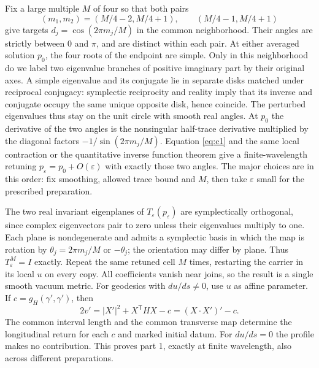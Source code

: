 \documentclass[11pt]{article}
\begin{document}
Fix a large multiple \(M\) of four so that both pairs
\begin{equation}\label{eq:targets}
 (m_1,m_2)=(M/4-2,M/4+1),\qquad (M/4-1,M/4+1)
\end{equation}
give targets \(d_j=\cos(2\pi m_j/M)\) in the common neighborhood. Their angles are strictly between \(0\) and \(\pi\), and are distinct within each pair. At either averaged solution \(p_0\), the four roots of the endpoint are simple. Only in this neighborhood do we label two eigenvalue branches of positive imaginary part by their original axes. A simple eigenvalue and its conjugate lie in separate disks matched under reciprocal conjugacy: symplectic reciprocity and reality imply that its inverse and conjugate occupy the same unique opposite disk, hence coincide. The perturbed eigenvalues thus stay on the unit circle with smooth real angles. At \(p_0\) the derivative of the two angles is the nonsingular half-trace derivative multiplied by the diagonal factors \(-1/\sin(2\pi m_j/M)\). Equation \eqref{eq:c1} and the same local contraction or the quantitative inverse function theorem give a finite-wavelength retuning \(p_\varepsilon=p_0+O(\varepsilon)\) with exactly those two angles. The major choices are in this order: fix smoothing, allowed trace bound and \(M\), then take \(\varepsilon\) small for the prescribed preparation.

The two real invariant eigenplanes of \(T_\varepsilon(p_\varepsilon)\) are symplectically orthogonal, since complex eigenvectors pair to zero unless their eigenvalues multiply to one. Each plane is nondegenerate and admits a symplectic basis in which the map is rotation by \(\theta_j=2\pi m_j/M\) or \(-\theta_j\); the orientation may differ by plane. Thus \(T_\varepsilon^M=I\) exactly. Repeat the same retuned cell \(M\) times, restarting the carrier in its local \(u\) on every copy. All coefficients vanish near joins, so the result is a single smooth vacuum metric. For geodesics with \(du/ds\ne0\), use \(u\) as affine parameter. If \(c=g_H(\gamma',\gamma')\), then
\[
 2v'=|X'|^2+X^\mathsf T H X-c=(X\cdot X')'-c.
\]
The common interval length and the common transverse map determine the longitudinal return for each \(c\) and marked initial datum. For \(du/ds=0\) the profile makes no contribution. This proves part 1, exactly at finite wavelength, also across different preparations.
\end{document}
